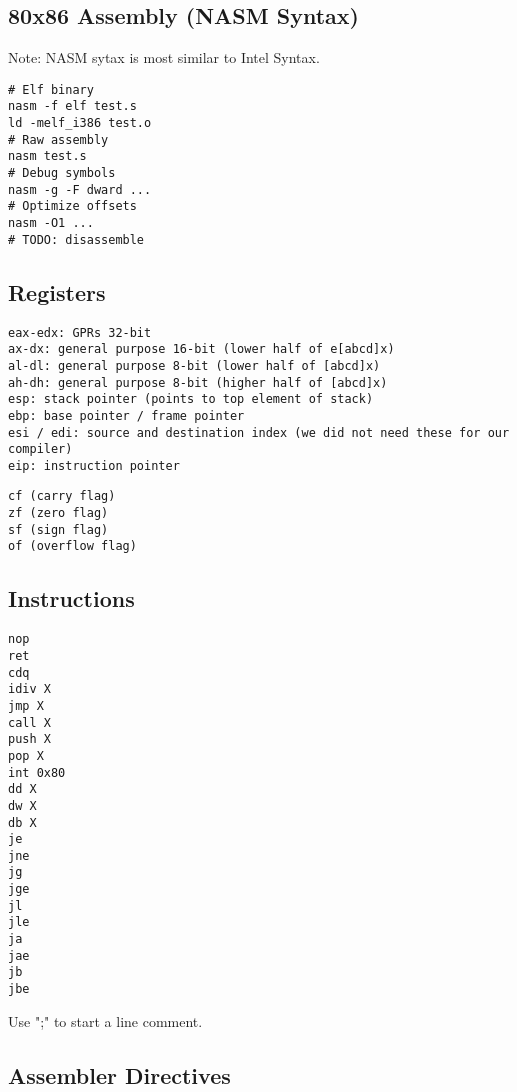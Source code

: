 \documentclass[8pt]{article}
\begin{document}
\begin{multicols}{5}

\section*{80x86 Assembly (NASM Syntax)}

Note: NASM sytax is most similar to Intel Syntax.

\begin{lstlisting}
# Elf binary
nasm -f elf test.s
ld -melf_i386 test.o
# Raw assembly
nasm test.s
# Debug symbols
nasm -g -F dward ...
# Optimize offsets
nasm -O1 ...
# TODO: disassemble
\end{lstlisting}

\subsection*{Registers}

\begin{lstlisting}
eax-edx: GPRs 32-bit
ax-dx: general purpose 16-bit (lower half of e[abcd]x)
al-dl: general purpose 8-bit (lower half of [abcd]x)
ah-dh: general purpose 8-bit (higher half of [abcd]x)
esp: stack pointer (points to top element of stack)
ebp: base pointer / frame pointer
esi / edi: source and destination index (we did not need these for our compiler)
eip: instruction pointer
\end{lstlisting}

\begin{lstlisting}
cf (carry flag)
zf (zero flag)
sf (sign flag)
of (overflow flag)
\end{lstlisting}


\subsection*{Instructions}

\begin{lstlisting}
nop
ret
cdq
idiv X
jmp X
call X
push X
pop X
int 0x80
dd X
dw X
db X
je
jne
jg
jge
jl
jle
ja
jae
jb
jbe
\end{lstlisting}

Use ";" to start a line comment.

\subsection*{Assembler Directives}


\end{multicols}
\end{document}
